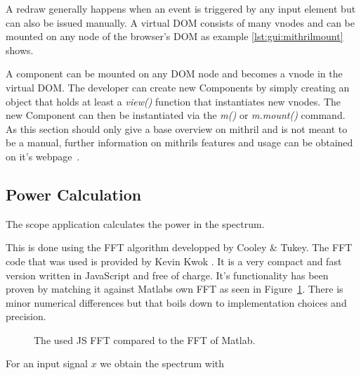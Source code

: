 A redraw generally happens when an event is triggered by any input element but can also be issued manually.
A virtual DOM consists of many vnodes and can be mounted on any node of the browser's DOM as example \ref{lst:gui:mithrilmount} shows.


A component can be mounted on any DOM node and becomes a vnode in the virtual DOM. The developer can create new Components by simply creating an object that holds at least a \textit{view()} function that instantiates new vnodes.
The new Component can then be instantiated via the \textit{m()} or \textit{m.mount()} command.
As this section should only give a base overview on mithril and is not meant to be a manual, further information on mithrils features and usage can be obtained on it's webpage~\cite{mithril:home}.

\subsection{Power Calculation}

The scope application calculates the power in the spectrum.

This is done using the FFT algorithm developped by Cooley \& Tukey. The FFT code that was used is provided by Kevin Kwok \cite{kwok}. It is a very compact and fast version written in JavaScript and free of charge. It's functionality has been proven by matching it against Matlabs own FFT as seen in Figure~\ref{fig:gui:fft_comparison}. There is minor numerical differences but that boils down to implementation choices and precision.

\begin{figure}
    \centering
    
    \caption[FFT comparison]{%
        The used JS FFT compared to the FFT of Matlab.%
    }
    \label{fig:gui:fft_comparison}
\end{figure}

For an input signal $x$ we obtain the spectrum with

